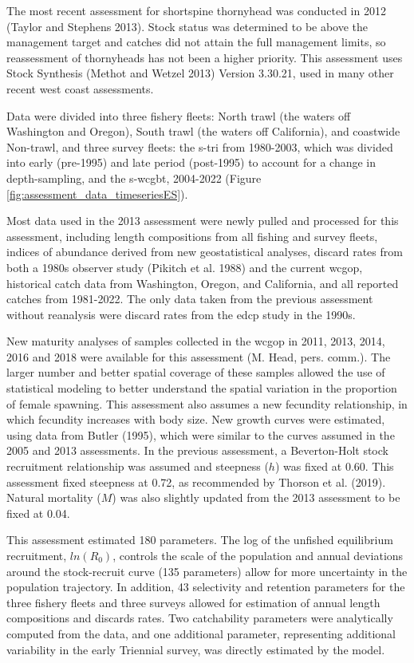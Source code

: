 \documentclass[11pt,
  english,
  letterpaper,
]{article}
\begin{document}
The most recent assessment for shortspine thornyhead was conducted in 2012 (Taylor and Stephens 2013). Stock status was determined to be above the management target and catches did not attain the full management limits, so reassessment of thornyheads has not been a higher priority. This assessment uses Stock Synthesis (Methot and Wetzel 2013) Version 3.30.21, used in many other recent west coast assessments.

Data were divided into three fishery fleets: North trawl (the waters off Washington and Oregon), South trawl (the waters off California), and coastwide Non-trawl, and three survey fleets: the \gls{s-tri} from 1980-2003, which was divided into early (pre-1995) and late period (post-1995) to account for a change in depth-sampling, and the \gls{s-wcgbt}, 2004-2022 (Figure \ref{fig:assessment_data_timeseriesES}).

Most data used in the 2013 assessment were newly pulled and processed for this assessment, including length compositions from all fishing and survey fleets, indices of abundance derived from new geostatistical analyses, discard rates from both a 1980s observer study (Pikitch et al. 1988) and the current \gls{wcgop}, historical catch data from Washington, Oregon, and California, and all reported catches from 1981-2022. The only data taken from the previous assessment without reanalysis were discard rates from the \gls{edcp} study in the 1990s.

New maturity analyses of samples collected in the \gls{wcgop} in 2011, 2013, 2014, 2016 and 2018 were available for this assessment (M. Head, pers. comm.). The larger number and better spatial coverage of these samples allowed the use of statistical modeling to better understand the spatial variation in the proportion of female spawning. This assessment also assumes a new fecundity relationship, in which fecundity increases with body size. New growth curves were estimated, using data from Butler (1995), which were similar to the curves assumed in the 2005 and 2013 assessments. In the previous assessment, a Beverton-Holt stock recruitment relationship was assumed and steepness (\(h\)) was fixed at 0.60. This assessment fixed steepness at 0.72, as recommended by Thorson et al. (2019). Natural mortality (\(M\)) was also slightly updated from the 2013 assessment to be fixed at 0.04.

This assessment estimated 180 parameters. The log of the unfished equilibrium recruitment, \(ln(R_0)\), controls the scale of the population and annual deviations around the stock-recruit curve (135 parameters) allow for more uncertainty in the population trajectory. In addition, 43 selectivity and retention parameters for the three fishery fleets and three surveys allowed for estimation of annual length compositions and discards rates. Two catchability parameters were analytically computed from the data, and one additional parameter, representing additional variability in the early Triennial survey, was directly estimated by the model.
\end{document}
